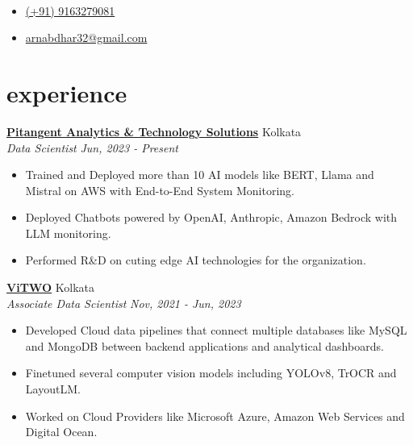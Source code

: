\documentclass[12pt]{article}
\newcommand{\heading}[2]{\centering{\sffamily\Huge #1}\\\smallskip{\large{#2}}}
\newcommand{\entry}[4]{{{\textbf{#1}}} \hfill #3 \\ #2 \hfill #4}
\begin{document}
\begin{paracol}{2}

\heading{Arnab Dhar}
\switchcolumn

\begin{itemize}[itemsep=1pt,label={}]
  \item \href{https://wa.me/9163279081}{(+91) 9163279081}
  \item \href{mailto:arnabdhar32@gmail.com}{arnabdhar32@gmail.com}
\end{itemize}

\switchcolumn*



\section{experience}

\entry{\href{https://in.linkedin.com/company/pitangent}{Pitangent Analytics \& Technology Solutions}}{\emph{Data Scientist}}{Kolkata}{\emph{Jun, 2023 - Present}}
\begin{itemize}
    \item Trained and Deployed more than 10 AI models like BERT, Llama and Mistral on AWS with End-to-End System Monitoring.
    \item Deployed Chatbots powered by OpenAI, Anthropic, Amazon Bedrock with LLM monitoring.
    \item Performed R\&D on cuting edge AI technologies for the organization. 
\end{itemize}


\medskip

\entry{\href{https://www.linkedin.com/company/vitwo}{ViTWO}}{\emph{Associate Data Scientist}}{Kolkata}{\emph{Nov, 2021 - Jun, 2023}}
\begin{itemize}
  \item Developed Cloud data pipelines that connect multiple databases like MySQL and MongoDB between backend applications and analytical dashboards.
  \item Finetuned several computer vision models including YOLOv8, TrOCR and LayoutLM.
  \item Worked on Cloud Providers like Microsoft Azure, Amazon Web Services and Digital Ocean.
\end{itemize}



\end{paracol}
\end{document}
